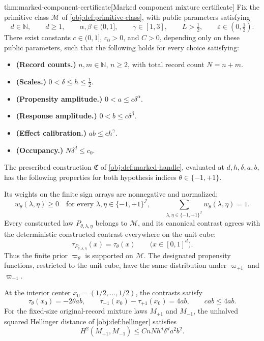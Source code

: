 \begin{theoremv}{thm:marked-component-certificate}[Marked component mixture certificate]
Fix the primitive class \(\mathcal M\) of \cref{obj:def:primitive-class}, with public parameters satisfying
\[
d\in\mathbb N,\qquad d\ge1,\qquad
\alpha,\beta\in(0,1],\qquad
\gamma\in[1,3],\qquad
L>\tfrac12,\qquad
\varepsilon\in(0,\tfrac12).
\]
There exist constants \(c\in(0,1]\), \(c_0>0\), and \(C>0\), depending only on these public parameters, such that the following holds for every choice satisfying:
\begin{itemize}
\item \textbf{(Record counts.)} \(n,m\in\mathbb N\), \(n\ge2\), with total record count \(N=n+m\).
\item \textbf{(Scales.)} \(0<\delta\le h\le\tfrac12\).
\item \textbf{(Propensity amplitude.)} \(0<a\le c\delta^\alpha\).
\item \textbf{(Response amplitude.)} \(0<b\le c\delta^\beta\).
\item \textbf{(Effect calibration.)} \(ab\le ch^\gamma\).
\item \textbf{(Occupancy.)} \(N\delta^d\le c_0\).
\end{itemize}
The prescribed construction \(\mathfrak C\) of \cref{obj:def:marked-handle}, evaluated at \(d,h,\delta,a,b\), has the following properties for both hypothesis indices \(\theta\in\{-1,+1\}\).

Its weights on the finite sign arrays are nonnegative and normalized:
\[
w_\theta(\lambda,\eta)\ge0
\quad\text{for every }\lambda,\eta\in\{-1,+1\}^{\mathcal I},
\qquad
\sum_{\lambda,\eta\in\{-1,+1\}^{\mathcal I}}
w_\theta(\lambda,\eta)=1.
\]
Every constructed law \(P_{\theta,\lambda,\eta}\) belongs to \(\mathcal M\), and its canonical contrast agrees with the deterministic constructed contrast everywhere on the unit cube:
\[
\tau_{P_{\theta,\lambda,\eta}}(x)=\tau_\theta(x)
\qquad
\bigl(x\in[0,1]^d\bigr).
\]
Thus the finite prior \(\varpi_\theta\) is supported on \(\mathcal M\). The designated propensity functions, restricted to the unit cube, have the same distribution under \(\varpi_{+1}\) and \(\varpi_{-1}\).

At the interior center \(x_0=(1/2,\ldots,1/2)\), the contrasts satisfy
\[
\tau_\theta(x_0)=-2\theta ab,
\qquad
\tau_{-1}(x_0)-\tau_{+1}(x_0)=4ab,
\qquad
cab\le4ab.
\]
For the fixed-size original-record mixture laws \(M_{+1}\) and \(M_{-1}\), the unhalved squared Hellinger distance of \cref{obj:def:hellinger} satisfies
\[
H^2(M_{+1},M_{-1})
\le CnNh^d\delta^da^2b^2.
\]


\end{theoremv}
